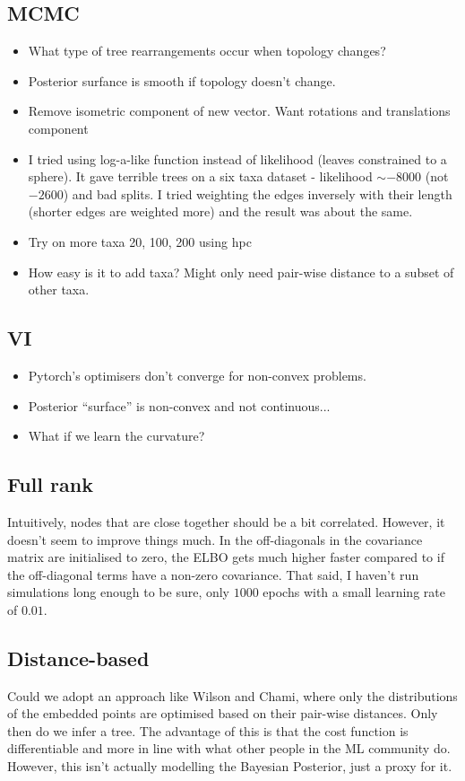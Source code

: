 \documentclass[11pt]{article}
\begin{document}
\subsection{MCMC}
\begin{itemize}
\item What type of tree rearrangements occur when topology changes?
\item Posterior surfance is smooth if topology doesn't change.
\item Remove isometric component of new vector. Want rotations and translations component
\item I tried using log-a-like function instead of likelihood \cite{wilson2021learning} (leaves constrained to a sphere). It gave terrible trees on a six taxa dataset - likelihood $\sim -8000$ (not $-2600$) and bad splits. I tried weighting the edges inversely with their length (shorter edges are weighted more) and the result was about the same.
\item Try on more taxa 20, 100, 200 using hpc
\item How easy is it to add taxa? Might only need pair-wise distance to a subset of other taxa.
\end{itemize}

\subsection{VI}
\begin{itemize}
\item Pytorch's optimisers don't converge for non-convex problems.
\item Posterior ``surface'' is non-convex and not continuous...
\item What if we learn the curvature?
\end{itemize}

\subsection{Full rank}
Intuitively, nodes that are close together should be a bit correlated. However, it doesn't seem to improve things much. In the off-diagonals in the covariance matrix are initialised to zero, the ELBO gets much higher faster compared to if the off-diagonal terms have a non-zero covariance. That said, I haven't run simulations long enough to be sure, only $1000$ epochs with a small learning rate of $0.01$.

\subsection{Distance-based}
Could we adopt an approach like Wilson and Chami, where only the distributions of the embedded points are optimised based on their pair-wise distances.
Only then do we infer a tree.
The advantage of this is that the cost function is differentiable and more in line with what other people in the ML community do.
However, this isn't actually modelling the Bayesian Posterior, just a proxy for it.
\end{document}
